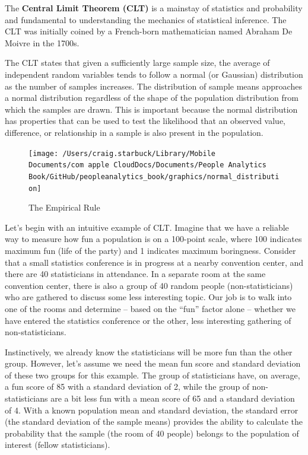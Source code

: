 \documentclass[
]{book}
\begin{document}
The \textbf{Central Limit Theorem (CLT)} is a mainstay of statistics and probability and fundamental to understanding the mechanics of statistical inference. The CLT was initially coined by a French-born mathematician named Abraham De Moivre in the 1700s.

The CLT states that given a sufficiently large sample size, the average of independent random variables tends to follow a normal (or Gaussian) distribution as the number of samples increases. The distribution of sample means approaches a normal distribution regardless of the shape of the population distribution from which the samples are drawn. This is important because the normal distribution has properties that can be used to test the likelihood that an observed value, difference, or relationship in a sample is also present in the population.

\begin{figure}

{\centering \texttt{[image: /Users/craig.starbuck/Library/Mobile Documents/com~apple~CloudDocs/Documents/People Analytics Book/GitHub/peopleanalytics\_book/graphics/normal\_distribution]} 

}

\caption{The Empirical Rule}\label{fig:emp-rule}
\end{figure}

Let's begin with an intuitive example of CLT. Imagine that we have a reliable way to measure how fun a population is on a 100-point scale, where 100 indicates maximum fun (life of the party) and 1 indicates maximum boringness. Consider that a small statistics conference is in progress at a nearby convention center, and there are 40 statisticians in attendance. In a separate room at the same convention center, there is also a group of 40 random people (non-statisticians) who are gathered to discuss some less interesting topic. Our job is to walk into one of the rooms and determine -- based on the ``fun'' factor alone -- whether we have entered the statistics conference or the other, less interesting gathering of non-statisticians.

Instinctively, we already know the statisticians will be more fun than the other group. However, let's assume we need the mean fun score and standard deviation of these two groups for this example. The group of statisticians have, on average, a fun score of 85 with a standard deviation of 2, while the group of non-statisticians are a bit less fun with a mean score of 65 and a standard deviation of 4. With a known population mean and standard deviation, the standard error (the standard deviation of the sample means) provides the ability to calculate the probability that the sample (the room of 40 people) belongs to the population of interest (fellow statisticians).
\end{document}

